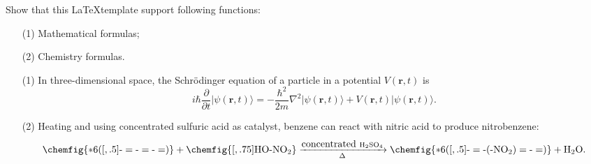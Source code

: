 \documentclass[en, twoside]{assignment}
\begin{document}
    \begin{prob}
        Show that this \LaTeX template support following functions:
        \begin{itemize}
            \item[(1)] Mathematical formulas;
            \item[(2)] Chemistry formulas.
        \end{itemize}
    \end{prob}
    \begin{pf}
        \begin{itemize}
            \item[(1)] In three-dimensional space, the Schrödinger equation of a particle in a potential $V(\bm{r},t)$ is
            \begin{equation}
                i\hbar\frac{\partial}{\partial t}\lvert\psi(\bm{r},t)\rangle=-\frac{\hbar^2}{2m}\nabla^2\lvert\psi(\bm{r},t)\rangle+V(\bm{r},t)\lvert\psi(\bm{r},t)\rangle.
            \end{equation}
            \item[(2)] Heating and using concentrated sulfuric acid as catalyst, benzene can react with nitric acid to produce nitrobenzene:
            \begin{equation}
                \ce{\chemfig{*6([,.5]-=-=-=)} + \chemfig{[,.75]HO-NO_2} ->[\mbox{concentrated }H2SO4][$\Delta$] \chemfig{*6([,.5]-=-(-NO_2)=-=)} + H2O}.
            \end{equation}

\end{itemize}
\end{pf}
\end{document}
